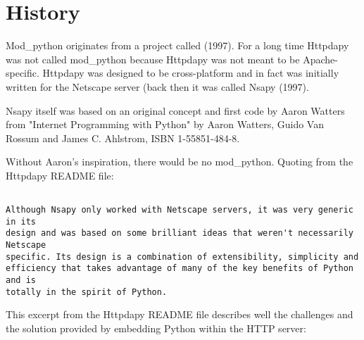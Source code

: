 \begin{seealso}
\end{seealso}

\section{History\label{intr-history}}

  Mod_python originates from a project called
  (1997). For a long time Httpdapy was not called mod_python because
  Httpdapy was not meant to be Apache-specific. Httpdapy was designed
  to be cross-platform and in fact was initially written for the
  Netscape server (back then it was called Nsapy (1997).

  Nsapy  itself was based on an original concept and first code by 
  Aaron Watters from "Internet Programming with Python" by Aaron Watters,
  Guido Van Rossum and James C. Ahlstrom, ISBN 1-55851-484-8.

  Without Aaron's inspiration, there would be no mod_python. Quoting from 
  the Httpdapy README file:

\begin{verbatim}

Although Nsapy only worked with Netscape servers, it was very generic in its
design and was based on some brilliant ideas that weren't necessarily Netscape
specific. Its design is a combination of extensibility, simplicity and 
efficiency that takes advantage of many of the key benefits of Python and is
totally in the spirit of Python.

\end{verbatim}

  This excerpt from the Httpdapy README file describes well the
  challenges and the solution provided by embedding Python within the
  HTTP server:

